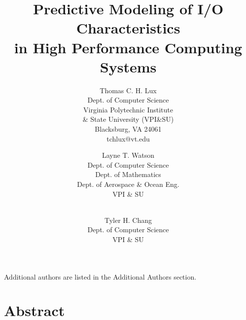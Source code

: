 \documentclass{scspaperproc}
\theoremstyle{scsthe}
\begin{document}

\def\SCSconferenceacro{SpringSim}
\def\SCSpublicationyear{2018}
\def\SCSconferencedates{April 15-18}
\def\SCSconferencevenue{Baltimore, MD, USA}
\def\SCSsymposiumacro{HPC} %

\title{Predictive Modeling of I/O Characteristics \\ in High
  Performance Computing Systems}

\author{Thomas C. H. Lux \\ [8pt]
Dept. of Computer Science \\
Virginia Polytechnic Institute\\
\& State University (VPI\&SU) \\
Blacksburg, VA 24061 \\
tchlux@vt.edu \\
\and
Layne T. Watson \\[8pt]
Dept. of Computer Science\\
Dept. of Mathematics\\
Dept. of Aerospace \& Ocean Eng.\\ 
VPI \& SU \\
\and
\vspace{-30pt}\\
Tyler H. Chang\\ [8pt]
Dept. of Computer Science \\
VPI \& SU \\
}

\maketitle

\vspace{-20pt}

Additional authors are listed in the Additional Authors section.

\section*{Abstract}
\end{document}
